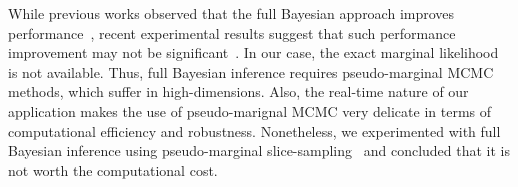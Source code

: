 While previous works observed that the full Bayesian approach improves performance~\cite{henrandez-lobato_predictive_2014, snoek_practical_2012}, recent experimental results suggest that such performance improvement may not be significant~\cite{ath_bayesian_2021}.
In our case, the exact marginal likelihood is not available.
Thus, full Bayesian inference requires pseudo-marginal MCMC~\cite{filippone_pseudomarginal_2014, pmlr-v51-murray16} methods, which suffer in high-dimensions.
Also, the real-time nature of our application makes the use of pseudo-marignal MCMC very delicate in terms of computational efficiency and robustness.
Nonetheless, we experimented with full Bayesian inference using pseudo-marginal slice-sampling~\cite{pmlr-v51-murray16} and concluded that it is not worth the computational cost.





